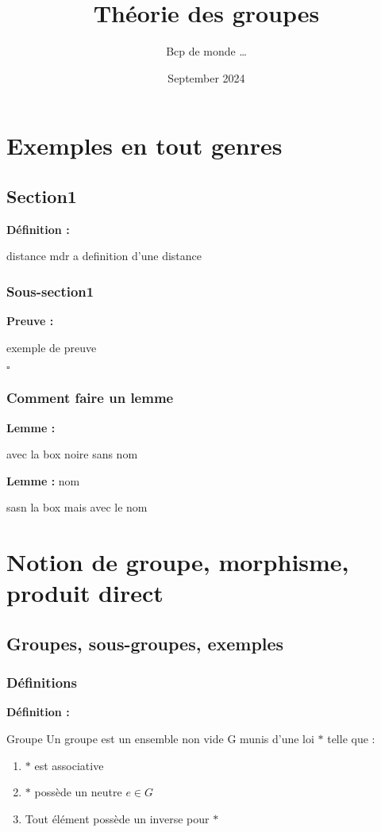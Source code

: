 \documentclass{report}
\title{Théorie des groupes}
\author{Bcp de monde \dots }
\date{September 2024}
\renewenvironment{leftbar}{%
  \def\FrameCommand{\vrule width 0.4pt \hspace{10pt}}%
  \MakeFramed {\advance\hsize-\width \FrameRestore}}%
 {\endMakeFramed}%
\newenvironment{definition}[1][]{
    \begin{tcolorbox}[colframe= white]
    \textbf{Définition :} 
    #1 \par
    }
    {\end{tcolorbox}}
\newenvironment{preuve}{\vspace*{0.5cm}
    \begin{leftbar}
    \noindent\textbf{Preuve :}\par}{
    \begin{flushright}
    $\square$
    \end{flushright}
    \end{leftbar}
}
\newenvironment{lemme}[2][white]{\begin{tcolorbox}[colframe= #1]
    \textbf{Lemme :} #2  \par}
    {\end{tcolorbox}}
\begin{document}
\maketitle

\tableofcontents

\chapter*{Exemples en tout genres}



\section{Section1}
\begin{definition}{distance}
    mdr a definition d'une distance
\end{definition}
\subsection{Sous-section1}


\begin{preuve}
    exemple de preuve
\end{preuve}

\subsection{Comment faire un lemme}
\begin{lemme}[black]{}
avec la box noire sans nom
\end{lemme}

\begin{lemme}{nom}
    sasn la box mais avec le nom
\end{lemme}



\chapter{Notion de groupe, morphisme, produit direct}


\section{Groupes, sous-groupes, exemples}

\subsection{Définitions}
\begin{definition}{Groupe}
Un groupe est un ensemble non vide G munis d'une loi $\ast$ telle que :
\begin{enumerate}[label=(\roman*)]
\item $\ast$ est associative
\item $\ast$ possède un neutre $e\in G$
\item Tout élément possède un inverse pour $\ast$
\end{enumerate}

\end{definition}
\end{document}
